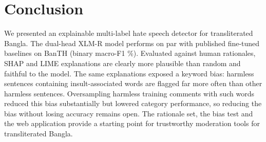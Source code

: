 \documentclass[conference,letterpaper,10pt]{IEEEtran}
\begin{document}
\section{Conclusion}
We presented an explainable multi-label hate speech detector for transliterated Bangla. The dual-head XLM-R model performs on par with published fine-tuned baselines on BanTH (binary macro-F1 \binF\%). Evaluated against human rationales, SHAP and LIME explanations are clearly more plausible than random and faithful to the model. The same explanations exposed a keyword bias: harmless sentences containing insult-associated words are flagged far more often than other harmless sentences. Oversampling harmless training comments with such words reduced this bias substantially but lowered category performance, so reducing the bias without losing accuracy remains open. The rationale set, the bias test and the web application provide a starting point for trustworthy moderation tools for transliterated Bangla.



\end{document}
